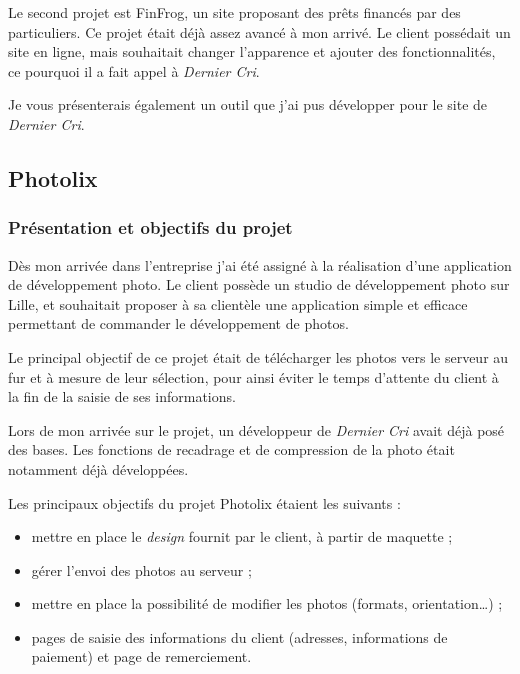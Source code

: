 \documentclass[12pt,a4paper]{article}
\providecommand{\tightlist}{%
  \setlength{\itemsep}{0pt}\setlength{\parskip}{0pt}}
\begin{document}
  \bigskip

  Le second projet est FinFrog, un site proposant des prêts financés par
  des particuliers. Ce projet était déjà assez avancé à mon arrivé. Le
  client possédait un site en ligne, mais souhaitait changer l'apparence
  et ajouter des fonctionnalités, ce pourquoi il a fait appel à
  \emph{Dernier Cri}.

  \bigskip

  Je vous présenterais également un outil que j'ai pus développer pour le
  site de \emph{Dernier Cri}.

  \bigskip

  \subsection{Photolix}\label{photolix}

  \subsubsection{Présentation et objectifs du
  projet}\label{pruxe9sentation-et-objectifs-du-projet}

  \bigskip

  Dès mon arrivée dans l'entreprise j'ai été assigné à la réalisation
  d'une application de développement photo. Le client possède un studio de
  développement photo sur Lille, et souhaitait proposer à sa clientèle une
  application simple et efficace permettant de commander le développement
  de photos.

  \bigskip

  Le principal objectif de ce projet était de télécharger les photos vers
  le serveur au fur et à mesure de leur sélection, pour ainsi éviter le
  temps d'attente du client à la fin de la saisie de ses informations.

  \bigskip

  Lors de mon arrivée sur le projet, un développeur de \emph{Dernier Cri}
  avait déjà posé des bases. Les fonctions de recadrage et de compression
  de la photo était notamment déjà développées.

  \bigskip

  Les principaux objectifs du projet Photolix étaient les suivants :

  \begin{itemize}
  \tightlist
  \item
    mettre en place le \emph{design} fournit par le client, à partir de
    maquette ;
  \item
    gérer l'envoi des photos au serveur ;
  \item
    mettre en place la possibilité de modifier les photos (formats,
    orientation\ldots{}) ;
  \item
    pages de saisie des informations du client (adresses, informations de
    paiement) et page de remerciement.
  \end{itemize}
\end{document}
